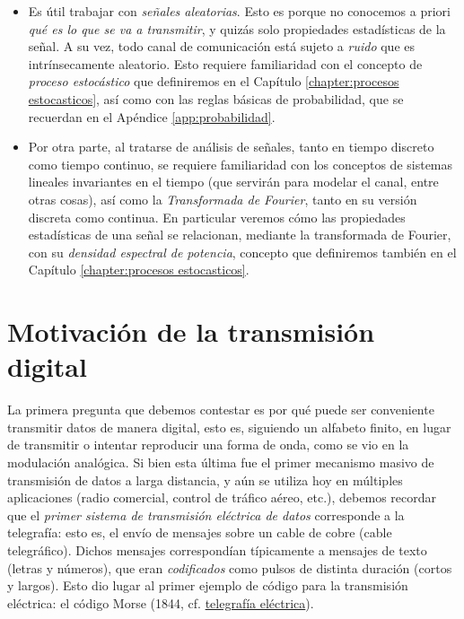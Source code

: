 \begin{itemize}
    \item Es útil trabajar con \emph{señales aleatorias}. Esto es porque no conocemos a priori \emph{qué es lo que se va a transmitir}, y quizás solo propiedades estadísticas de la señal. A su vez, todo canal de comunicación está sujeto a \emph{ruido} que es intrínsecamente aleatorio. Esto requiere familiaridad con el concepto de \emph{proceso estocástico} que definiremos en el Capítulo \ref{chapter:procesos estocasticos}, así como con las reglas básicas de probabilidad, que se recuerdan en el Apéndice \ref{app:probabilidad}.
    
    \item Por otra parte, al tratarse de análisis de señales, tanto en tiempo discreto como tiempo continuo, se requiere familiaridad con los conceptos de sistemas lineales invariantes en el tiempo (que servirán para modelar el canal, entre otras cosas), así como la \emph{Transformada de Fourier}, tanto en su versión discreta como continua. En particular veremos cómo las propiedades estadísticas de una señal se relacionan, mediante la transformada de Fourier, con su \emph{densidad espectral de potencia}, concepto que definiremos también en el Capítulo \ref{chapter:procesos estocasticos}.
\end{itemize}

\section{Motivación de la transmisión digital}

La primera pregunta que debemos contestar es por qué puede ser conveniente transmitir datos de manera digital, esto es, siguiendo un alfabeto finito, en lugar de transmitir o intentar reproducir una forma de onda, como se vio en la modulación analógica. Si bien esta última fue el primer mecanismo masivo de transmisión de datos a larga distancia, y aún se utiliza hoy en múltiples aplicaciones (radio comercial, control de tráfico aéreo, etc.), debemos recordar que el \emph{primer sistema de transmisión eléctrica de datos} corresponde a la telegrafía: esto es, el envío de mensajes sobre un cable de cobre (cable telegráfico). Dichos mensajes correspondían típicamente a mensajes de texto (letras y números), que eran \emph{codificados} como pulsos de distinta duración (cortos y largos). Esto dio lugar al primer ejemplo de código para la transmisión eléctrica: el código Morse (1844, cf. \href{https://en.wikipedia.org/wiki/Electrical_telegraph}{telegrafía eléctrica}).


